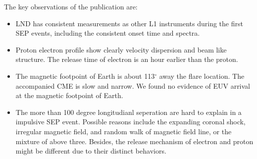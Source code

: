 The key observations of the publication are:
\begin{itemize}
    \item \ac{LND} has consistent measurements as other L1 instruments during the first \ac{SEP} events, including the consistent onset time and spectra.
    \item Proton electron profile show clearly velocity dispersion and beam like structure. The release time of electron is an hour earlier than the proton.
    \item The magnetic footpoint of Earth is about 113$^\circ$ away the flare location. The accompanied \ac{CME} is slow and narrow. We found no evidence of EUV arrival at the magnetic footpoint of Earth. 
    \item The more than 100 degree longitudianl seperation are hard to explain in a impulsive \ac{SEP} event. Possible reasons include the expanding coronal shock, irregular magnetic field, and random walk of magnetic field line, or the mixture of above three. Besides, the release mechanism of electron and proton might be different due to their distinct behaviors.
\end{itemize}


